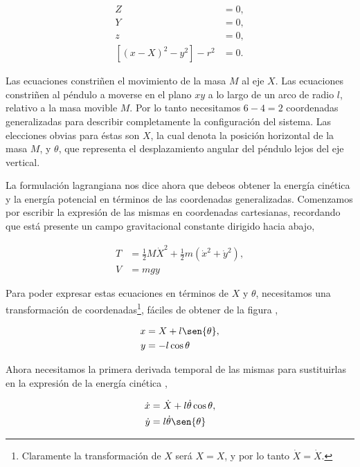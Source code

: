 \documentclass[a4paper,10pt]{article}
\numberwithin{equation}{section}
\begin{document}
\begin{align}
\label{eq:pendu1}
 Z &= 0, \\
\label{eq:pendu2}
 Y &= 0, \\
\label{eq:pendu3}
 z &= 0, \\
\label{eq:pendu4}
 [(x-X)^2 - y^2] - r^2 &= 0.
\end{align}

Las ecuaciones  constriñen el movimiento de la masa $M$ 
al eje $X$. Las ecuaciones  constriñen al péndulo a moverse 
en el plano $xy$ a lo largo de un arco de radio $l$, relativo a la masa movible $M$. Por 
lo tanto necesitamos $6-4 = 2$ coordenadas generalizadas para describir completamente 
la configuración del sistema. Las elecciones obvias para éstas son $X$, la cual denota 
la posición horizontal de la masa $M$, y $\theta$, que representa el desplazamiento 
angular del péndulo lejos del eje vertical.

\vspace{.3cm}

La formulación lagrangiana nos dice ahora que debeos obtener la energía cinética y la 
energía potencial en términos de las coordenadas generalizadas. Comenzamos por escribir 
la expresión de las mismas en coordenadas cartesianas, recordando que está presente un 
campo gravitacional constante dirigido hacia abajo,

\begin{align}
\label{eq:pendu5}
 T &= \frac{1}{2} M \dot{X}^2 + \frac{1}{2}m(\dot{x}^2+\dot{y}^2), \\
\label{eq:pendu6}
 V &= mgy
 \end{align}

Para poder expresar estas ecuaciones en términos de $X$ y $\theta$, necesitamos una 
transformación de coordenadas\footnote{Claramente la transformación de $X$ será $X = X$, 
y por lo tanto $\dot{X} = \dot{X}$.}, fáciles de obtener de la figura 
,

\begin{align}
 x &= X + l \sen{\theta}, \\
 y &= -l \cos{\theta}
\end{align}

Ahora necesitamos la primera derivada temporal de las mismas para sustituirlas en 
la expresión de la energía cinética ,

\begin{align}
 \dot{x} &= \dot{X} + l \dot{\theta} \cos{\theta}, \\
 \dot{y} &= l \dot{\theta} \sen{\theta}
\end{align}
\end{document}
